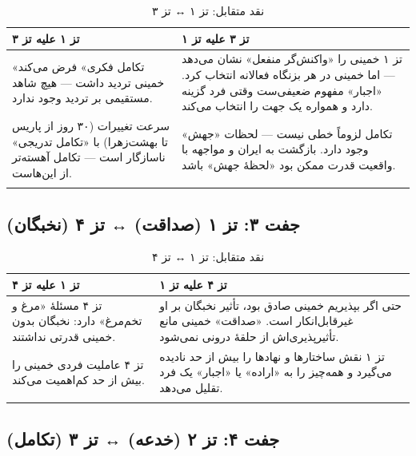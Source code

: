 \documentclass[12pt,a4paper]{book}
\begin{document}
\begin{longtable}{%
    >{\raggedleft\arraybackslash}p{}
    >{\raggedleft\arraybackslash}p{}}
\toprule
\rowcolor{cGreen!10}
\textbf{تز ۱ علیه تز ۳} &
\rowcolor{cGold!10}
\textbf{تز ۳ علیه تز ۱} \\
\midrule

«تکامل فکری» فرض می‌کند خمینی تردید داشت — هیچ شاهد مستقیمی بر تردید وجود ندارد. &
تز ۱ خمینی را «واکنش‌گر منفعل» نشان می‌دهد — اما خمینی در هر بزنگاه فعالانه انتخاب کرد. «اجبار» مفهوم ضعیفی‌ست وقتی فرد گزینه دارد و همواره یک جهت را انتخاب می‌کند. \\
\midrule

سرعت تغییرات (۳۰ روز از پاریس تا بهشت‌زهرا) با «تکامل تدریجی» ناسازگار است — تکامل آهسته‌تر از این‌هاست. &
تکامل لزوماً خطی نیست — لحظات «جهش» وجود دارد. بازگشت به ایران و مواجهه با واقعیت قدرت ممکن بود «لحظهٔ جهش» باشد. \\

\bottomrule
\caption{نقد متقابل: تز ۱ ↔ تز ۳}
\end{longtable}

\subsection{جفت ۳: تز ۱ (صداقت) ↔ تز ۴ (نخبگان)}

\begin{longtable}{%
    >{\raggedleft\arraybackslash}p{}
    >{\raggedleft\arraybackslash}p{}}
\toprule
\rowcolor{cGreen!10}
\textbf{تز ۱ علیه تز ۴} &
\rowcolor{cConsolid!8}
\textbf{تز ۴ علیه تز ۱} \\
\midrule

تز ۴ مسئلهٔ «مرغ و تخم‌مرغ» دارد: نخبگان بدون خمینی قدرتی نداشتند. &
حتی اگر بپذیریم خمینی صادق بود، تأثیر نخبگان بر او غیرقابل‌انکار است. «صداقت» خمینی مانع تأثیرپذیری‌اش از حلقهٔ درونی نمی‌شود. \\
\midrule

تز ۴ عاملیت فردی خمینی را بیش از حد کم‌اهمیت می‌کند. &
تز ۱ نقش ساختارها و نهادها را بیش از حد نادیده می‌گیرد و همه‌چیز را به «اراده» یا «اجبار» یک فرد تقلیل می‌دهد. \\

\bottomrule
\caption{نقد متقابل: تز ۱ ↔ تز ۴}
\end{longtable}

\subsection{جفت ۴: تز ۲ (خدعه) ↔ تز ۳ (تکامل)}
\end{document}
